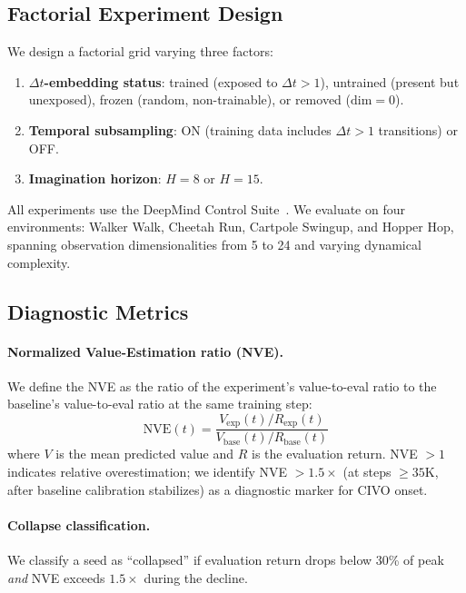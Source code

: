 \documentclass[10pt,letterpaper]{article}
\newcommand{\dt}{\Delta t}
\begin{document}
\subsection{Factorial Experiment Design}

We design a factorial grid varying three factors:
\begin{enumerate}[itemsep=2pt]
    \item \textbf{$\dt$-embedding status}: trained (exposed to $\dt > 1$), untrained (present but unexposed), frozen (random, non-trainable), or removed ($\text{dim}=0$).
    \item \textbf{Temporal subsampling}: ON (training data includes $\dt > 1$ transitions) or OFF.
    \item \textbf{Imagination horizon}: $H = 8$ or $H = 15$.
\end{enumerate}

All experiments use the DeepMind Control Suite~\citep{tassa2018deepmind}. We evaluate on four environments: Walker Walk, Cheetah Run, Cartpole Swingup, and Hopper Hop, spanning observation dimensionalities from 5 to 24 and varying dynamical complexity.

\subsection{Diagnostic Metrics}

\paragraph{Normalized Value-Estimation ratio (NVE).}
We define the NVE as the ratio of the experiment's value-to-eval ratio to the baseline's value-to-eval ratio at the same training step:
\[
\text{NVE}(t) = \frac{V_{\text{exp}}(t) / R_{\text{exp}}(t)}{V_{\text{base}}(t) / R_{\text{base}}(t)}
\]
where $V$ is the mean predicted value and $R$ is the evaluation return. NVE $> 1$ indicates relative overestimation; we identify NVE $> 1.5\times$ (at steps $\geq 35$K, after baseline calibration stabilizes) as a diagnostic marker for CIVO onset.

\paragraph{Collapse classification.}
We classify a seed as ``collapsed'' if evaluation return drops below 30\% of peak \emph{and} NVE exceeds $1.5\times$ during the decline.

\end{document}

